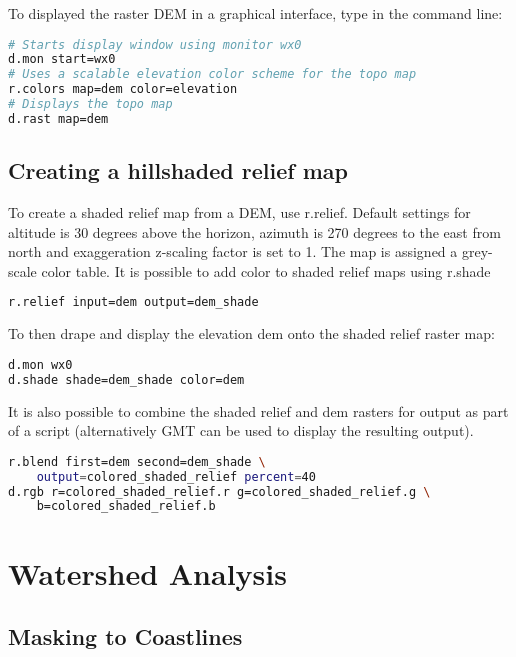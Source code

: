 To displayed the raster DEM in a graphical interface, type in the command line:

\begin{lstlisting}[language=bash]
# Starts display window using monitor wx0
d.mon start=wx0
# Uses a scalable elevation color scheme for the topo map			
r.colors map=dem color=elevation
# Displays the topo map 	
d.rast map=dem
\end{lstlisting}

\subsection*{Creating a hillshaded relief map}

To create a shaded relief map from a DEM, use r.relief. Default settings for altitude is 30 degrees above the horizon, azimuth is 270 degrees to the east from north and exaggeration z-scaling factor is set to 1. The map is assigned a grey-scale color table. It is possible to add color to shaded relief maps using r.shade

\begin{lstlisting}[language=bash]
r.relief input=dem output=dem_shade
\end{lstlisting}

To then drape  and display the elevation dem onto the shaded relief raster map:

\begin{lstlisting}[language=bash]
d.mon wx0
d.shade shade=dem_shade color=dem
\end{lstlisting}

It is also possible to combine the shaded relief and dem rasters for output as part of a script (alternatively GMT can be used to display the resulting output). 

\begin{lstlisting}[language=bash]
r.blend first=dem second=dem_shade \ 
	output=colored_shaded_relief percent=40
d.rgb r=colored_shaded_relief.r g=colored_shaded_relief.g \
	b=colored_shaded_relief.b
\end{lstlisting}

\section{Watershed Analysis}

\subsection{Masking to Coastlines}

